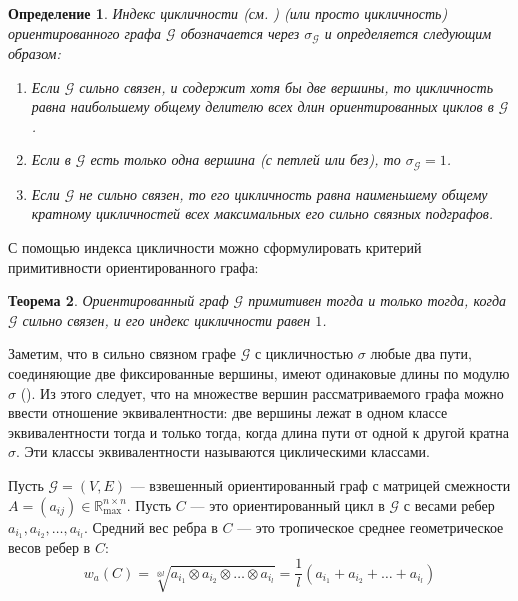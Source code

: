 \documentclass[12pt]{article}
\newtheorem{theorem}{Теорема}[section]
\newtheorem{definition}[theorem]{Определение}
\begin{document}
\begin{definition}
Индекс цикличности (см. \cite{cyclicity}) (или просто цикличность) ориентированного графа $\mathcal{G}$ обозначается через $\sigma_\mathcal{G}$ и определяется следующим образом:
\begin{enumerate}
    \item Если $\mathcal{G}$ сильно связен, и содержит хотя бы две вершины, то цикличность равна наибольшему общему делителю всех длин ориентированных циклов в $\mathcal{G}$.
    \item Если в $\mathcal{G}$ есть только одна вершина (с петлей или без), то $\sigma_\mathcal{G} = 1$.
    \item Если $\mathcal{G}$ не сильно связен, то его цикличность равна наименьшему общему кратному цикличностей всех максимальных его сильно связных подграфов.
\end{enumerate}
\end{definition}

С помощью индекса цикличности можно сформулировать критерий примитивности ориентированного графа:

\begin{theorem}\cite[теорема 3.4.4]{Brualdi}
Ориентированный граф $\mathcal{G}$ примитивен тогда и только тогда, когда $\mathcal{G}$ сильно связен, и его индекс цикличности равен $1$.
\end{theorem}

Заметим, что в сильно связном графе $\mathcal{G}$ с цикличностью $\sigma$ любые два пути, соединяющие две фиксированные вершины, имеют одинаковые длины по модулю $\sigma$ (\cite[замечание 2.3]{cyclicity}). Из этого следует, что на множестве вершин рассматриваемого графа можно ввести отношение эквивалентности: две вершины лежат в одном классе эквивалентности тогда и только тогда, когда длина пути от одной к другой кратна $\sigma$. Эти классы эквивалентности называются циклическими классами.

Пусть $\mathcal{G} = (V, E)$ --- взвешенный ориентированный граф с матрицей смежности $A = (a_{ij}) \in \mathbb{R}_{\max}^{n \times n}$. Пусть $C$ --- это ориентированный цикл в $\mathcal{G}$ с весами ребер $a_{i_1}, a_{i_2}, \dots, a_{i_l}$. Средний вес ребра в $C$ --- это тропическое среднее геометрическое весов ребер в $C$:
\begin{equation*}
    w_a(C) = \sqrt[\otimes l]{a_{i_1} \otimes a_{i_2} \otimes \dots \otimes a_{i_l}}=
    \frac{1}{l}(a_{i_1} + a_{i_2} + \dots + a_{i_l})
\end{equation*}
\end{document}
